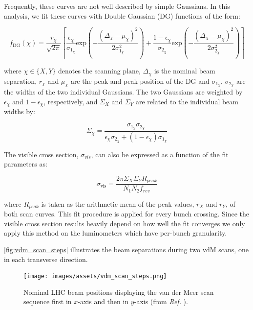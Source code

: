 Frequently, these curves are not well described by simple Gaussians. In this analysis, we fit these curves with Double Gaussian (DG) functions of the form:

\begin{equation}
    f_{\text{DG}}(\chi) = 
    \frac{r_{\chi}}{\sqrt{2\pi}} 
    \left[ 
        \frac{\epsilon_{\chi}}{\sigma_{1_{\chi}}} \text{exp} \left( -\frac{\left( \Delta_{\chi} - \mu_{\chi} \right)^2}{2\sigma^2_{1_{\chi}}} \right) +
        \frac{1 - \epsilon_{\chi}}{\sigma_{2_{\chi}}} \text{exp} \left( -\frac{\left( \Delta_{\chi} - \mu_{\chi} \right)^2}{2\sigma^2_{2_{\chi}}} \right)
    \right]
    \label{eq:double_gaussian_model}
\end{equation}

where $\chi \in \{X, Y\}$ denotes the scanning plane, $\Delta_{\chi}$ is the nominal beam separation, $r_{\chi}$ and $\mu_{\chi}$ are the peak and peak position of the DG and $\sigma_{1_{\chi}}$, $\sigma_{2_{\chi}}$ are the widths of the two individual Gaussians. The two Gaussians are weighted by $\epsilon_{\chi}$ and $1 - \epsilon_{\chi}$, respectively, and $\Sigma_{X}$ and $\Sigma_{Y}$ are related to the individual beam widths by: 

\begin{equation}
    \Sigma_{\chi} = \frac{\sigma_{1_{\chi}}\sigma_{2_{\chi}}}{\epsilon_{\chi}\sigma_{2_{\chi}} + \left( 1 - \epsilon_{\chi}\right) \sigma_{1_{\chi}}}
\end{equation}

The visible cross section, $\sigma_{vis}$, can also be expressed as a function of the fit parameters as:

\begin{equation}
    \sigma_{\mathrm{vis}} =  \frac{2\pi \Sigma_{X} \Sigma_{Y} R_{peak}}{N_1 N_2 f_{rev}}
    \label{eq:calibration_from_fit_parameters}
\end{equation}

where $R_{peak}$ is taken as the arithmetic mean of the peak values, $r_X$ and $r_Y$, of both scan curves. This fit procedure is applied for every bunch crossing. Since the visible cross section results heavily depend on how well the fit converges we only apply this method on the luminometers which have per-bunch granularity.

\autoref{fig:vdm_scan_steps} illustrates the beam separations during two vdM scans, one in each transverse direction.

\begin{figure}[!htb]
	\centering
	\texttt{[image: images/assets/vdm\_scan\_steps.png]}
	\caption[Example vdM scan sequence positions]{Nominal LHC beam positions displaying the van der Meer scan sequence first in $x$-axis and then in $y$-axis (from \textit{Ref.} \cite{Saariokari:2826125}).}
	\label{fig:vdm_scan_steps}
\end{figure}

